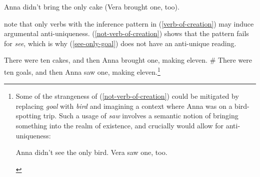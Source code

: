 \begin{exe}
	\ex Anna didn't bring the only cake (Vera brought one, too).
\end{exe}

\citeauthor{cb2015} note that only verbs with the inference pattern in (\ref{verb-of-creation}) may induce argumental anti-uniqueness. (\ref{not-verb-of-creation}) shows that the pattern fails for \textit{see}, which is why (\ref{see-only-goal}) does not have an anti-unique reading.

\begin{exe}
	\ex \label{verb-of-creation} There were ten cakes, and then Anna brought one, making eleven.
	\ex \label{not-verb-of-creation} \# There were ten goals, and then Anna saw one, making eleven.\footnote{Some of the strangeness of (\ref{not-verb-of-creation}) could be mitigated by replacing \textit{goal} with \textit{bird} and imagining a context where Anna was on a bird-spotting trip. Such a usage of \textit{saw} involves a semantic notion of bringing something into the realm of existence, and crucially would allow for anti-uniqueness: \begin{exe} \ex Anna didn't see the only bird. Vera saw one, too. \end{exe} }
\end{exe}